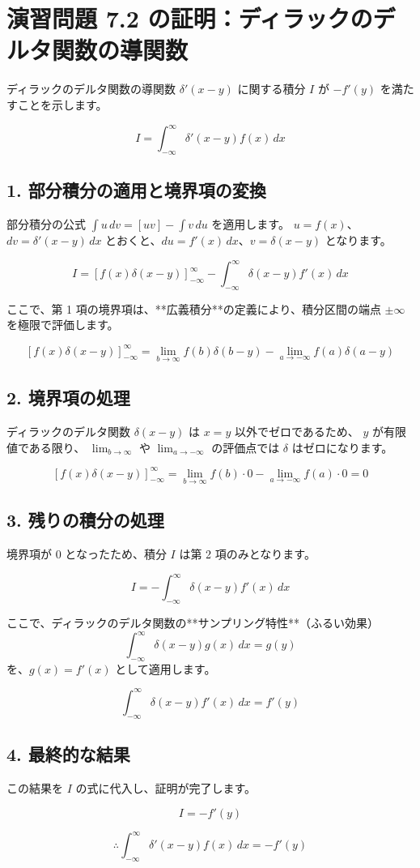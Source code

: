 \documentclass{ltjsarticle}
\begin{document}
\section*{演習問題 7.2 の証明：ディラックのデルタ関数の導関数}

ディラックのデルタ関数の導関数 $\delta'(x-y)$ に関する積分 $I$ が $-f'(y)$ を満たすことを示します。

$$I = \int_{-\infty}^{\infty} \delta'(x-y) f(x) \, dx$$

\subsection*{1. 部分積分の適用と境界項の変換}

部分積分の公式 $\int u \, dv = [uv] - \int v \, du$ を適用します。
$u = f(x)$、 $dv = \delta'(x-y) \, dx$ とおくと、$du = f'(x) \, dx$、$v = \delta(x-y)$ となります。

$$I = \left[ f(x) \delta(x-y) \right]_{-\infty}^{\infty} - \int_{-\infty}^{\infty} \delta(x-y) f'(x) \, dx$$

ここで、第 1 項の境界項は、**広義積分**の定義により、積分区間の端点 $\pm\infty$ を極限で評価します。

$$\left[ f(x)\delta(x-y) \right]_{-\infty}^{\infty} = \lim_{b\to\infty} f(b)\delta(b-y) - \lim_{a\to-\infty} f(a)\delta(a-y)$$

\subsection*{2. 境界項の処理}

ディラックのデルタ関数 $\delta(x-y)$ は $x=y$ 以外でゼロであるため、 $y$ が有限値である限り、 $\lim_{b\to\infty}$ や $\lim_{a\to-\infty}$ の評価点では $\delta$ はゼロになります。

$$\left[ f(x)\delta(x-y) \right]_{-\infty}^{\infty} = \lim_{b\to\infty} f(b) \cdot 0 - \lim_{a\to-\infty} f(a) \cdot 0 = 0$$

\subsection*{3. 残りの積分の処理}

境界項が $0$ となったため、積分 $I$ は第 2 項のみとなります。

$$I = - \int_{-\infty}^{\infty} \delta(x-y) f'(x) \, dx$$

ここで、ディラックのデルタ関数の**サンプリング特性**（ふるい効果）
$$\int_{-\infty}^{\infty} \delta(x-y) g(x) \, dx = g(y)$$
を、$g(x) = f'(x)$ として適用します。

$$\int_{-\infty}^{\infty} \delta(x-y) f'(x) \, dx = f'(y)$$

\subsection*{4. 最終的な結果}

この結果を $I$ の式に代入し、証明が完了します。

$$I = - f'(y)$$

$$\therefore \int_{-\infty}^{\infty} \delta'(x-y) f(x) \, dx = -f'(y)$$
\end{document}
